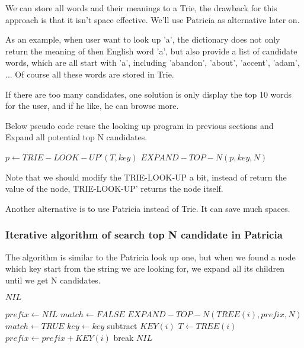 \documentclass{article}
\begin{document}
We can store all words and their meanings to a Trie, the drawback for this
approach is that it isn't space effective. We'll use Patricia as alternative
later on.

As an example, when user want to look up 'a', the dictionary does not only
return the meaning of then English word 'a', but also provide a list of
candidate words, which are all start with 'a', including 'abandon', 'about',
'accent', 'adam', ... Of course all these words are stored in Trie.

If there are too many candidates, one solution is only display the top 10
words for the user, and if he like, he can browse more.

Below pseudo code reuse the looking up program in previous sections and
Expand all potential top N candidates.

\begin{algorithmic}[1]
  \State $p \leftarrow TRIE-LOOK-UP'(T, key)$
  \State \Return $EXPAND-TOP-N(p, key, N)$
\EndFunction
\end{algorithmic}

Note that we should modify the TRIE-LOOK-UP a bit, instead of return
the value of the node, TRIE-LOOK-UP' returns the node itself.

Another alternative is to use Patricia instead of Trie. It can save much
spaces.

\subsubsection{Iterative algorithm of search top N candidate in Patricia}

The algorithm is similar to the Patricia look up one, but when we found
a node which key start from the string we are looking for, we expand
all its children until we get N candidates.

\begin{algorithmic}[1]
     \State \Return $NIL$ \EndIf

  \State $prefix \leftarrow NIL$
  \Repeat
    \State $match \leftarrow FALSE$
        \State \Return $EXPAND-TOP-N(TREE(i), prefix, N)$
      \EndIf
        \State $match \leftarrow TRUE$
        \State $key \leftarrow key$ subtract $KEY(i)$
        \State $T \leftarrow TREE(i)$
        \State $prefix \leftarrow prefix + KEY(i)$
        \State break
      \EndIf
    \EndFor
  \State \Return $NIL$
\EndFunction
\end{algorithmic}
\end{document}

